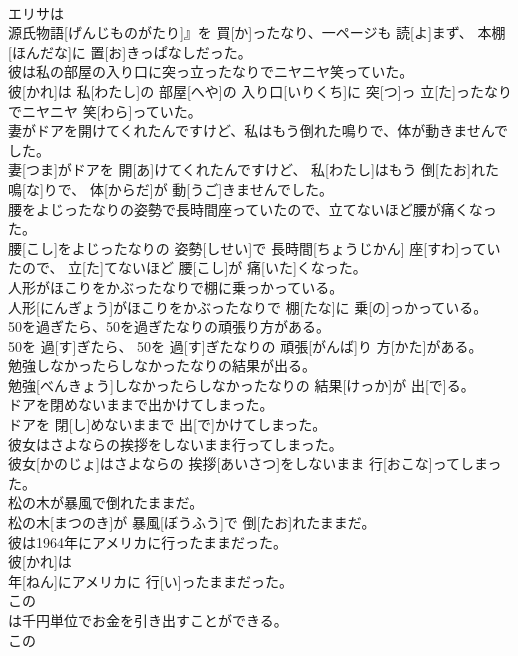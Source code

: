\documentclass[8pt]{extreport}
\begin{document}
\begin{CJK}{UTF8}{min}
\\	エリサは
\\	源氏物語[げんじものがたり]』を 買[か]ったなり、一ページも 読[よ]まず、 本棚[ほんだな]に 置[お]きっぱなしだった。
\\	彼は私の部屋の入り口に突っ立ったなりでニヤニヤ笑っていた。	
\\	彼[かれ]は 私[わたし]の 部屋[へや]の 入り口[いりくち]に 突[つ]っ 立[た]ったなりでニヤニヤ 笑[わら]っていた。
\\	妻がドアを開けてくれたんですけど、私はもう倒れた鳴りで、体が動きませんでした。	
\\	妻[つま]がドアを 開[あ]けてくれたんですけど、 私[わたし]はもう 倒[たお]れた 鳴[な]りで、 体[からだ]が 動[うご]きませんでした。
\\	腰をよじったなりの姿勢で長時間座っていたので、立てないほど腰が痛くなった。	
\\	腰[こし]をよじったなりの 姿勢[しせい]で 長時間[ちょうじかん] 座[すわ]っていたので、 立[た]てないほど 腰[こし]が 痛[いた]くなった。
\\	人形がほこりをかぶったなりで棚に乗っかっている。	
\\	人形[にんぎょう]がほこりをかぶったなりで 棚[たな]に 乗[の]っかっている。
\\	50を過ぎたら、50を過ぎたなりの頑張り方がある。	
\\	50を 過[す]ぎたら、 50を 過[す]ぎたなりの 頑張[がんば]り 方[かた]がある。
\\	勉強しなかったらしなかったなりの結果が出る。	
\\	勉強[べんきょう]しなかったらしなかったなりの 結果[けっか]が 出[で]る。
\\	ドアを閉めないままで出かけてしまった。	
\\	ドアを 閉[し]めないままで 出[で]かけてしまった。
\\	彼女はさよならの挨拶をしないまま行ってしまった。	
\\	彼女[かのじょ]はさよならの 挨拶[あいさつ]をしないまま 行[おこな]ってしまった。
\\	松の木が暴風で倒れたままだ。	
\\	松の木[まつのき]が 暴風[ぼうふう]で 倒[たお]れたままだ。
\\	彼は1964年にアメリカに行ったままだった。	
\\	彼[かれ]は 
\\	年[ねん]にアメリカに 行[い]ったままだった。
\\	この
\\	は千円単位でお金を引き出すことができる。	
\\	この 

\end{CJK}
\end{document}
